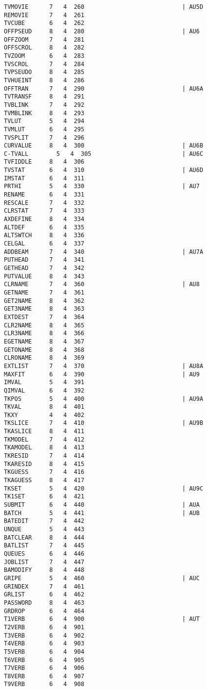 \begin{verbatim}
TVMOVIE      7   4  260                            | AU5D
REMOVIE      7   4  261
TVCUBE       6   4  262
OFFPSEUD     8   4  280                            | AU6
OFFZOOM      7   4  281
OFFSCROL     8   4  282
TVZOOM       6   4  283
TVSCROL      7   4  284
TVPSEUDO     8   4  285
TVHUEINT     8   4  286
OFFTRAN      7   4  290                            | AU6A
TVTRANSF     8   4  291
TVBLINK      7   4  292
TVMBLINK     8   4  293
TVLUT        5   4  294
TVMLUT       6   4  295
TVSPLIT      7   4  296
CURVALUE     8   4  300                            | AU6B
C-TVALL        5   4  305                          | AU6C
TVFIDDLE     8   4  306
TVSTAT       6   4  310                            | AU6D
IMSTAT       6   4  311
PRTHI        5   4  330                            | AU7
RENAME       6   4  331
RESCALE      7   4  332
CLRSTAT      7   4  333
AXDEFINE     8   4  334
ALTDEF       6   4  335
ALTSWTCH     8   4  336
CELGAL       6   4  337
ADDBEAM      7   4  340                            | AU7A
PUTHEAD      7   4  341
GETHEAD      7   4  342
PUTVALUE     8   4  343
CLRNAME      7   4  360                            | AU8
GETNAME      7   4  361
GET2NAME     8   4  362
GET3NAME     8   4  363
EXTDEST      7   4  364
CLR2NAME     8   4  365
CLR3NAME     8   4  366
EGETNAME     8   4  367
GETONAME     8   4  368
CLRONAME     8   4  369
EXTLIST      7   4  370                            | AU8A
MAXFIT       6   4  390                            | AU9
IMVAL        5   4  391
QIMVAL       6   4  392
TKPOS        5   4  400                            | AU9A
TKVAL        8   4  401
TKXY         4   4  402
TKSLICE      7   4  410                            | AU9B
TKASLICE     8   4  411
TKMODEL      7   4  412
TKAMODEL     8   4  413
TKRESID      7   4  414
TKARESID     8   4  415
TKGUESS      7   4  416
TKAGUESS     8   4  417
TKSET        5   4  420                            | AU9C
TK1SET       6   4  421
SUBMIT       6   4  440                            | AUA
BATCH        5   4  441                            | AUB
BATEDIT      7   4  442
UNQUE        5   4  443
BATCLEAR     8   4  444
BATLIST      7   4  445
QUEUES       6   4  446
JOBLIST      7   4  447
BAMODIFY     8   4  448
GRIPE        5   4  460                            | AUC
GRINDEX      7   4  461
GRLIST       6   4  462
PASSWORD     8   4  463
GRDROP       6   4  464
T1VERB       6   4  900                            | AUT
T2VERB       6   4  901
T3VERB       6   4  902
T4VERB       6   4  903
T5VERB       6   4  904
T6VERB       6   4  905
T7VERB       6   4  906
T8VERB       6   4  907
T9VERB       6   4  908
\end{verbatim}
